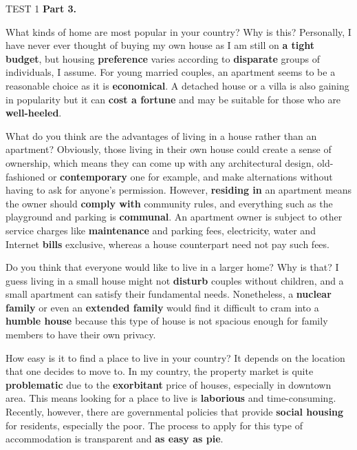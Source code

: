 \begin{glossarymc}[Cambridge 11]
\begin{test}{TEST 1}
    \noindent
    \textbf{Part 3.}
    \begin{qa}{What kinds of home are most popular in your country? Why is this?}
    Personally, I have never ever thought of buying my own house as I am still on \textbf{a tight budget}, but housing \textbf{preference} varies according to \textbf{disparate} groups of individuals, I assume. For young married couples, an apartment seems to be a reasonable choice as it is \textbf{economical}. A detached house or a villa is also gaining in popularity but it can \textbf{cost a fortune} and may be suitable for those who are \textbf{well-heeled}.
    \end{qa}

    \begin{qa}{What do you think are the advantages of living in a house rather than an apartment?}
    Obviously, those living in their own house could create a sense of ownership, which means they can come up with any architectural design, old-fashioned or \textbf{contemporary} one for example, and make alternations without having to ask for anyone’s permission. However, \textbf{residing in} an apartment means the owner should \textbf{comply with} community rules, and everything such as the playground and parking is \textbf{communal}. An apartment owner is subject to other service charges like \textbf{maintenance} and parking fees, electricity, water and Internet \textbf{bills} exclusive, whereas a house counterpart need not pay such fees.
    \end{qa}

    \begin{qa}{Do you think that everyone would like to live in a larger home? Why is that?}
    I guess living in a small house might not \textbf{disturb} couples without children, and a small apartment can satisfy their fundamental needs. Nonetheless, a \textbf{nuclear family} or even an \textbf{extended family} would find it difficult to cram into a \textbf{humble house} because this type of house is not spacious enough for family members to have their own privacy.
    \end{qa}

    \begin{qa}{How easy is it to find a place to live in your country?}
    It depends on the location that one decides to move to. In my country, the property market is quite \textbf{problematic} due to the \textbf{exorbitant} price of houses, especially in downtown area. This means looking for a place to live is \textbf{laborious} and time-consuming. Recently, however, there are governmental policies that provide \textbf{social housing} for residents, especially the poor. The process to apply for this type of accommodation is transparent and \textbf{as easy as pie}.
    \end{qa}


\end{test}
\end{glossarymc}
